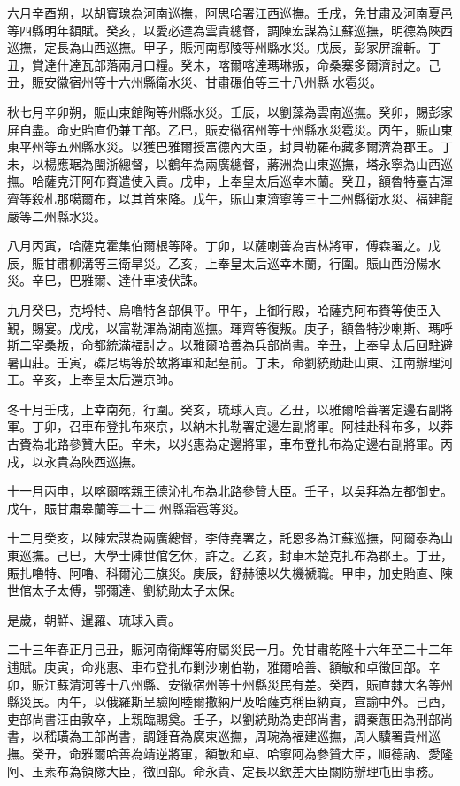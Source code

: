 \begin{pinyinscope}
六月辛酉朔，以胡寶瑔為河南巡撫，阿思哈署江西巡撫。壬戌，免甘肅及河南夏邑等四縣明年額賦。癸亥，以愛必達為雲貴總督，調陳宏謀為江蘇巡撫，明德為陜西巡撫，定長為山西巡撫。甲子，賑河南鄢陵等州縣水災。戊辰，彭家屏論斬。丁丑，賞達什達瓦部落兩月口糧。癸未，喀爾喀達瑪琳叛，命桑寨多爾濟討之。己丑，賑安徽宿州等十六州縣衛水災、甘肅碾伯等三十八州縣水雹災。

秋七月辛卯朔，賑山東館陶等州縣水災。壬辰，以劉藻為雲南巡撫。癸卯，賜彭家屏自盡。命史貽直仍兼工部。乙巳，賑安徽宿州等十州縣水災雹災。丙午，賑山東東平州等五州縣水災。以獲巴雅爾授富德內大臣，封貝勒羅布藏多爾濟為郡王。丁未，以楊應琚為閩浙總督，以鶴年為兩廣總督，蔣洲為山東巡撫，塔永寧為山西巡撫。哈薩克汗阿布賚遣使入貢。戊申，上奉皇太后巡幸木蘭。癸丑，額魯特臺吉渾齊等殺札那噶爾布，以其首來降。戊午，賑山東濟寧等三十二州縣衛水災、福建龍嚴等二州縣水災。

八月丙寅，哈薩克霍集伯爾根等降。丁卯，以薩喇善為吉林將軍，傅森署之。戊辰，賑甘肅柳溝等三衛旱災。乙亥，上奉皇太后巡幸木蘭，行圍。賑山西汾陽水災。辛巳，巴雅爾、達什車凌伏誅。

九月癸巳，克埒特、烏嚕特各部俱平。甲午，上御行殿，哈薩克阿布賚等使臣入覲，賜宴。戊戌，以富勒渾為湖南巡撫。琿齊等復叛。庚子，額魯特沙喇斯、瑪呼斯二宰桑叛，命都統滿福討之。以雅爾哈善為兵部尚書。辛丑，上奉皇太后回駐避暑山莊。壬寅，磔尼瑪等於故將軍和起墓前。丁未，命劉統勛赴山東、江南辦理河工。辛亥，上奉皇太后還京師。

冬十月壬戌，上幸南苑，行圍。癸亥，琉球入貢。乙丑，以雅爾哈善署定邊右副將軍。丁卯，召車布登扎布來京，以納木扎勒署定邊左副將軍。阿桂赴科布多，以莽古賚為北路參贊大臣。辛未，以兆惠為定邊將軍，車布登扎布為定邊右副將軍。丙戌，以永貴為陜西巡撫。

十一月丙申，以喀爾喀親王德沁扎布為北路參贊大臣。壬子，以吳拜為左都御史。戊午，賑甘肅皋蘭等二十二州縣霜雹等災。

十二月癸亥，以陳宏謀為兩廣總督，李侍堯署之，託恩多為江蘇巡撫，阿爾泰為山東巡撫。己巳，大學士陳世倌乞休，許之。乙亥，封車木楚克扎布為郡王。丁丑，賑扎嚕特、阿嚕、科爾沁三旗災。庚辰，舒赫德以失機褫職。甲申，加史貽直、陳世倌太子太傅，鄂彌達、劉統勛太子太保。

是歲，朝鮮、暹羅、琉球入貢。

二十三年春正月己丑，賑河南衛輝等府屬災民一月。免甘肅乾隆十六年至二十二年逋賦。庚寅，命兆惠、車布登扎布剿沙喇伯勒，雅爾哈善、額敏和卓徵回部。辛卯，賑江蘇清河等十八州縣、安徽宿州等十州縣災民有差。癸酉，賑直隸大名等州縣災民。丙午，以俄羅斯呈驗阿睦爾撒納尸及哈薩克稱臣納貢，宣諭中外。己酉，吏部尚書汪由敦卒，上親臨賜奠。壬子，以劉統勛為吏部尚書，調秦蕙田為刑部尚書，以嵇璜為工部尚書，調鍾音為廣東巡撫，周琬為福建巡撫，周人驥署貴州巡撫。癸丑，命雅爾哈善為靖逆將軍，額敏和卓、哈寧阿為參贊大臣，順德訥、愛隆阿、玉素布為領隊大臣，徵回部。命永貴、定長以欽差大臣關防辦理屯田事務。


\end{pinyinscope}
